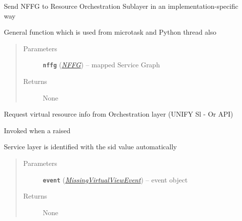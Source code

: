 \documentclass[letterpaper,10pt,english]{sphinxmanual}
\begin{document}
\begin{fulllineitems}
\begin{fulllineitems}
\begin{quote}
\begin{description}
\end{description}\end{quote}

\end{fulllineitems}


\begin{fulllineitems}
\label{service/sas_API:escape.service.sas_API.ServiceLayerAPI._instantiate_NFFG}
Send NFFG to Resource Orchestration Sublayer in an implementation-specific
way

General function which is used from microtask and Python thread also
\begin{quote}\begin{description}
\item[{Parameters}] \leavevmode
\textbf{\texttt{nffg}} ({\hyperref[util/nffg:escape.util.nffg.NFFG]{\emph{\emph{NFFG}}}}) -- mapped Service Graph

\item[{Returns}] \leavevmode
None

\end{description}\end{quote}

\end{fulllineitems}


\begin{fulllineitems}
\label{service/sas_API:escape.service.sas_API.ServiceLayerAPI._handle_MissingVirtualViewEvent}
Request virtual resource info from Orchestration layer (UNIFY Sl - Or API)

Invoked when a  raised

Service layer is identified with the sid value automatically
\begin{quote}\begin{description}
\item[{Parameters}] \leavevmode
\textbf{\texttt{event}} ({\hyperref[service/sas_orchestration:escape.service.sas_orchestration.MissingVirtualViewEvent]{\emph{\emph{MissingVirtualViewEvent}}}}) -- event object

\item[{Returns}] \leavevmode
None


\end{description}
\end{quote}
\end{fulllineitems}
\end{fulllineitems}
\end{document}
